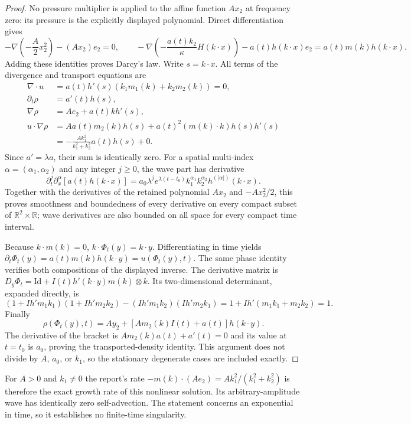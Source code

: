 \begin{proof}
No pressure multiplier is applied to the affine function $Ax_2$ at
frequency zero: its pressure is the explicitly displayed polynomial.
Direct differentiation gives
\[
 -\nabla\left(-\frac A2x_2^2\right)-(Ax_2)e_2=0,
 \qquad
 -\nabla\left(-\frac{a(t)k_2}{\kappa}H(k\cdot x)\right)
       -a(t)h(k\cdot x)e_2=a(t)m(k)h(k\cdot x).
\]
Adding these identities proves Darcy's law. Write $s=k\cdot x$.
All terms of the divergence and transport equations are
\begin{align*}
 \nabla\cdot u&=a(t)h'(s)(k_1m_1(k)+k_2m_2(k))=0,\\
 \partial_t\rho&=a'(t)h(s),\\
 \nabla\rho&=Ae_2+a(t)k h'(s),\\
 u\cdot\nabla\rho
 &=Aa(t)m_2(k)h(s)+a(t)^2(m(k)\cdot k)h(s)h'(s)\\
 &=-\frac{A k_1^2}{k_1^2+k_2^2}a(t)h(s)+0.
\end{align*}
Since $a'=\lambda a$, their sum is identically zero.
For a spatial multi-index $\alpha=(\alpha_1,\alpha_2)$ and any integer
$j\ge0$, the wave part has derivative
\[
 \partial_t^j\partial_x^\alpha[a(t)h(k\cdot x)]
 =a_0\lambda^j e^{\lambda(t-t_0)}
     k_1^{\alpha_1}k_2^{\alpha_2}h^{(|\alpha|)}(k\cdot x).
\]
Together with the derivatives of the retained polynomial $Ax_2$ and
$-Ax_2^2/2$, this proves smoothness and boundedness of every derivative on
every compact subset of $\mathbb R^2\times\mathbb R$; wave derivatives are
also bounded on all space for every compact time interval.

Because $k\cdot m(k)=0$, $k\cdot\Phi_t(y)=k\cdot y$.
Differentiating in time yields
$\partial_t\Phi_t(y)=a(t)m(k)h(k\cdot y)=u(\Phi_t(y),t)$.
The same phase identity verifies both compositions of the displayed inverse.
The derivative matrix is
$D_y\Phi_t=\mathrm{Id}+I(t)h'(k\cdot y)m(k)\otimes k$.
Its two-dimensional determinant, expanded directly, is
\[
 (1+Ih'm_1k_1)(1+Ih'm_2k_2)-(Ih'm_1k_2)(Ih'm_2k_1)
 =1+Ih'(m_1k_1+m_2k_2)=1.
\]
Finally
\[
 \rho(\Phi_t(y),t)=Ay_2+
       [A m_2(k)I(t)+a(t)]h(k\cdot y).
\]
The derivative of the bracket is $A m_2(k)a(t)+a'(t)=0$ and its value at
$t=t_0$ is $a_0$, proving the transported-density identity. This argument
does not divide by $A$, $a_0$, or $k_1$, so the stationary degenerate cases
are included exactly.
\end{proof}

For $A>0$ and $k_1\ne0$ the report's rate
$-m(k)\cdot(Ae_2)=A k_1^2/(k_1^2+k_2^2)$ is therefore the exact growth rate
of this nonlinear solution. Its arbitrary-amplitude wave has identically
zero self-advection. The statement concerns an exponential in time, so it
establishes no finite-time singularity.

